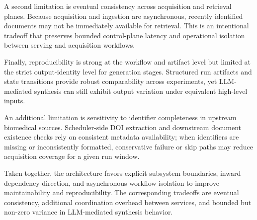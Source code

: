 A second limitation is eventual consistency across acquisition and retrieval planes. Because acquisition and ingestion are asynchronous, recently identified documents may not be immediately available for retrieval. This is an intentional tradeoff that preserves bounded control-plane latency and operational isolation between serving and acquisition workflows.

Finally, reproducibility is strong at the workflow and artifact level but limited at the strict output-identity level for generation stages. Structured run artifacts and state transitions provide robust comparability across experiments, yet LLM-mediated synthesis can still exhibit output variation under equivalent high-level inputs.

An additional limitation is sensitivity to identifier completeness in upstream biomedical sources. Scheduler-side DOI extraction and downstream document existence checks rely on consistent metadata availability; when identifiers are missing or inconsistently formatted, conservative failure or skip paths may reduce acquisition coverage for a given run window.

Taken together, the architecture favors explicit subsystem boundaries, inward dependency direction, and asynchronous workflow isolation to improve maintainability and reproducibility. The corresponding tradeoffs are eventual consistency, additional coordination overhead between services, and bounded but non-zero variance in LLM-mediated synthesis behavior.
